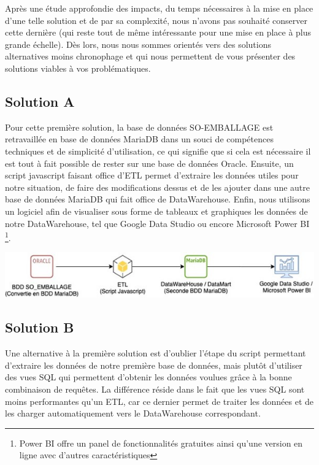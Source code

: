 Après une étude approfondie des impacts, du temps nécessaires à la mise en place d’une telle solution et de par sa complexité, nous n’avons pas souhaité conserver cette dernière (qui reste tout de même intéressante pour une mise en place à plus grande échelle). Dès lors, nous nous sommes orientés vers des solutions alternatives moins chronophage et qui nous permettent de vous présenter des solutions viables à vos problématiques. 

\subsection{Solution A}

Pour cette première solution, la base de données SO-EMBALLAGE est retravaillée en base de données MariaDB dans un souci de compétences techniques et de simplicité d'utilisation, ce qui signifie que si cela est nécessaire il est tout à fait possible de rester sur une base de données Oracle. Ensuite, un script javascript faisant office d’ETL permet d'extraire les données utiles pour notre situation, de faire des modifications dessus et de les ajouter dans une autre base de données MariaDB qui fait office de DataWarehouse. Enfin, nous utilisons un logiciel afin de visualiser sous forme de tableaux et graphiques les données de notre DataWarehouse, tel que Google Data Studio ou encore Microsoft Power BI \footnote{Power BI offre un panel de fonctionnalités gratuites ainsi qu'une version en ligne avec d'autres caractéristiques}. 

\begin{center}
	\includegraphics[scale=0.86]{images/solution_a.jpg} 
\end{center}  

\subsection{Solution B}

Une alternative à la première solution est d'oublier l'étape du script permettant d'extraire les données de notre première base de données, mais plutôt d'utiliser des vues SQL qui permettent d'obtenir les données voulues grâce à la bonne combinaison de requêtes. La différence réside dans le fait que les vues SQL sont moins performantes qu’un ETL, car ce dernier permet de traiter les données et de les charger automatiquement vers le DataWarehouse correspondant. 

